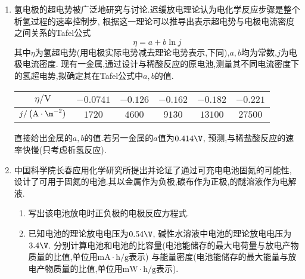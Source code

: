 \documentclass{ctexart}
\begin{document}
\begin{problem}
    \begin{enumerate}[label=\tbf{\arabic{Pcounter}-\arabic*},topsep=0pt,parsep=0pt,itemsep=0pt,partopsep=0pt]
        \item 氢电极的超电势被广泛地研究与讨论.迟缓放电理论认为电化学反应步骤是整个析氢过程的速率控制步,%
            根据这一理论可以推导出表示超电势与电极电流密度之间关系的Tafel公式
            \[\eta=a+b\ln j\]
            其中$\eta$为氢超电势(用电极实际电势减去理论电势表示,下同),$a,b$均为常数,$j$为电极电流密度.%
            现有一金属,通过设计与稀酸反应的原电池,测量其不同电流密度下的氢超电势,拟确定其在Tafel公式中$a,b$的值.
            \vspace{-5pt}\begin{table}[H]\centering
            \begin{tabular}{|c|c|c|c|c|c|}
            \hline $\eta/\text{V}$ 
            & $-0.0741$ & $-0.126$  & $-0.162$  & $-0.182$  & $-0.221$ \\
            \hline $j/\left(\text{A}\cdot\m^{-2}\right)$
            & $1720$    & $4600$    & $9130$    & $13100$   & $27500$ \\\hline
            \end{tabular}
            \end{table}\vspace{-15pt}
            直接给出金属的$a,b$的值.若另一金属的$a$值为$0.414\V$,%
            预测,与稀盐酸反应的速率快慢(只考虑析氢反应).
        \item 中国科学院长春应用化学研究所提出并论证了通过可充电电池固氮的可能性,%
            设计了可用于固氮的电池.其以金属作为负极,碳布作为正极,的醚溶液作为电解液.
            \begin{enumerate}[label=\tbf{\arabic{Pcounter}-2-\arabic*},topsep=0pt,parsep=0pt,itemsep=0pt,partopsep=0pt,leftmargin=10pt]
                \item 写出该电池放电时正负极的电极反应方程式.
                \item 已知电池的理论放电电压为$0.54\V$,%
                    碱性水溶液中电池的理论放电电压为$3.4\V$.%
                    分别计算电池和电池的比容量(电池能储存的最大电荷量与放电产物质量的比值,单位用$\text{mA}\cdot\text{h}/\text{g}$表示)%
                    与能量密度(电池能储存的最大能量与放电产物质量的比值,单位用$\text{mW}\cdot\text{h}/\text{g}$表示).
            \end{enumerate}
    \end{enumerate}
\end{problem}
\end{document}
